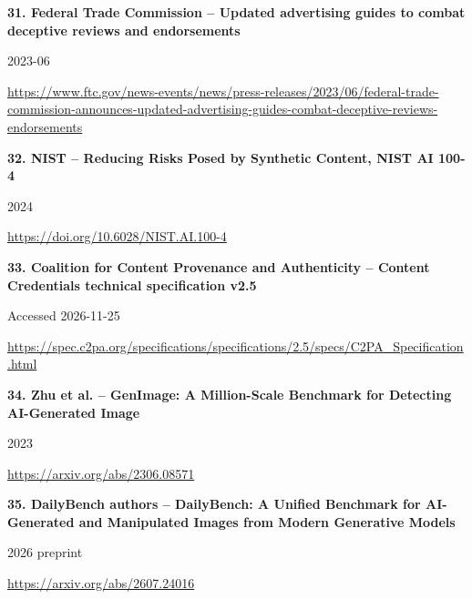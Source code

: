 \documentclass[11pt,a4paper]{article}
\begin{document}
\noindent\begin{minipage}{\linewidth}\textbf{31. Federal Trade Commission -- Updated advertising guides to combat deceptive reviews and endorsements}\par{\small 2023-06\par\url{https://www.ftc.gov/news-events/news/press-releases/2023/06/federal-trade-commission-announces-updated-advertising-guides-combat-deceptive-reviews-endorsements}}\par
\end{minipage}\par\vspace{2mm}
\noindent\begin{minipage}{\linewidth}\textbf{32. NIST -- Reducing Risks Posed by Synthetic Content, NIST AI 100-4}\par{\small 2024\par\url{https://doi.org/10.6028/NIST.AI.100-4}}\par
\end{minipage}\par\vspace{2mm}
\noindent\begin{minipage}{\linewidth}\textbf{33. Coalition for Content Provenance and Authenticity -- Content Credentials technical specification v2.5}\par{\small Accessed 2026-11-25\par\url{https://spec.c2pa.org/specifications/specifications/2.5/specs/C2PA_Specification.html}}\par
\end{minipage}\par\vspace{2mm}
\noindent\begin{minipage}{\linewidth}\textbf{34. Zhu et al. -- GenImage: A Million-Scale Benchmark for Detecting AI-Generated Image}\par{\small 2023\par\url{https://arxiv.org/abs/2306.08571}}\par
\end{minipage}\par\vspace{2mm}
\noindent\begin{minipage}{\linewidth}\textbf{35. DailyBench authors -- DailyBench: A Unified Benchmark for AI-Generated and Manipulated Images from Modern Generative Models}\par{\small 2026 preprint\par\url{https://arxiv.org/abs/2607.24016}}\par
\end{minipage}\par\vspace{2mm}
\end{document}
